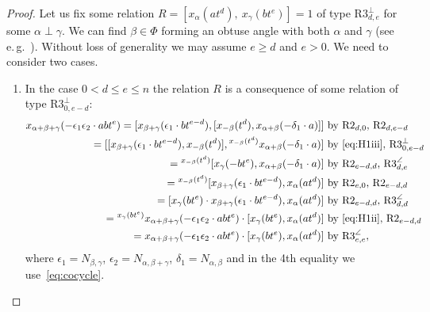 \documentclass[oneside, 8pt]{amsart}
\theoremstyle{remark}
\theoremstyle{definition}
\numberwithin{lemma}{section}
\numberwithin{prop}{section}
\numberwithin{corollary}{section}
\numberwithin{externaltheorem}{section}
\numberwithin{equation}{section}
\begin{document}
\begin{proof}
Let us fix some relation $R = [x_\alpha(at^d),\ x_\gamma(bt^e)] = 1$ of type $\text{R3}^\bot_{d,e}$ for some $\alpha\perp\gamma$. We can find $\beta \in \Phi$ forming an obtuse angle with both $\alpha$ and $\gamma$ (see e.\,g.~\cite[Lemma~3.1.2]{RS76}).
Without loss of generality we may assume $e \geq d$ and $e > 0$. We need to consider two cases.
\begin{enumerate}
\item In the case $0 < d \leq e \leq n$ the relation $R$ is a consequence of some relation of type $\text{R3}^\bot_{0,e-d}$:
\begin{align} x_{\alpha+\beta+\gamma}(-\epsilon_1 \epsilon_2 \cdot abt^e) = 
[x_{\beta+\gamma}(\epsilon_1 \cdot bt^{e-d}), [x_{-\beta}(t^d), x_{\alpha+\beta}(-\delta_1 \cdot a)] ] & \text{ by $\text{R2}_{d,0}$, $\text{R2}_{d, e-d}$} \label{first-computation} \\ 
 = [[x_{\beta+\gamma}(\epsilon_1 \cdot bt^{e-d}), x_{-\beta}(t^d)], {}^{x_{-\beta}(t^d)} x_{\alpha+\beta}(- \delta_1 \cdot a)] & \text{ by~\eqref{eq:H1iii}, $\text{R3}^\bot_{0,e-d}$} \nonumber \\ 
 = {}^{x_{-\beta}(t^d)} [x_{\gamma}(- bt^e), x_{\alpha+\beta}(-\delta_1 \cdot a)] & \text{ by $\text{R2}_{e-d,d}$, $\text{R3}^\angle_{d,e}$} \nonumber \\ 
 = {}^{x_{-\beta}(t^d)} [x_{\beta + \gamma}(\epsilon_1 \cdot bt^{e-d}), x_{\alpha}(at^d)] & \text{ by $\text{R2}_{e,0}$, $\text{R2}_{e-d,d}$} \nonumber \\ 
 = [x_{\gamma}(bt^e) \cdot x_{\beta + \gamma}(\epsilon_1 \cdot bt^{e-d}), x_{\alpha}(at^d)] & \text{ by $\text{R2}_{e-d,d}$, $\text{R3}^\angle_{d,d}$} \nonumber \\ 
 = {}^{x_\gamma(bt^e)}x_{\alpha+\beta+\gamma}(-\epsilon_1\epsilon_2 \cdot abt^e) \cdot [x_\gamma(bt^e), x_\alpha(at^d)] & \text{ by~\eqref{eq:H1ii}, $\text{R2}_{e-d,d}$} \nonumber \\
 = x_{\alpha+\beta+\gamma}(-\epsilon_1\epsilon_2 \cdot abt^e) \cdot [x_\gamma(bt^e), x_\alpha(at^d)] & \text{ by $\text{R3}^\angle_{e,e}$}, \nonumber \end{align}
 where $\epsilon_1 = N_{\beta,\gamma}$, $\epsilon_2 = N_{\alpha,\beta+\gamma}$, $\delta_1 = N_{\alpha,\beta}$ and in the 4th equality we use~\eqref{eq:cocycle}.
  

\end{enumerate}
\end{proof}
\end{document}
